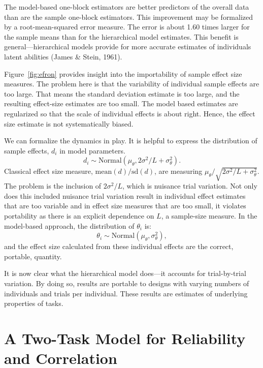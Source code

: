\documentclass[english,man]{apa6}
\theoremstyle{definition}
\theoremstyle{definition}
\theoremstyle{remark}
\begin{document}
The model-based one-block estimators are better predictors of the
overall data than are the sample one-block estimators. This improvement
may be formalized by a root-mean-squared error measure. The error is
about 1.60 times larger for the sample means than for the hierarchical
model estimates. This benefit is general---hierarchical models provide
for more accurate estimates of individuals latent abilities (James \&
Stein, 1961).

Figure~\ref{fig:efron} provides insight into the importability of sample
effect size measures. The problem here is that the variability of
individual sample effects are too large. That means the standard
deviation estimate is too large, and the resulting effect-size estimates
are too small. The model based estimates are regularized so that the
scale of individual effects is about right. Hence, the effect size
estimate is not systematically biased.

We can formalize the dynamics in play. It is helpful to express the
distribution of sample effects, \(d_i\) in model parameters. \[
d_i \sim \mbox{Normal}(\mu_\theta,2\sigma^2/L + \sigma^2_\theta).
\] Classical effect size measure, \(\mbox{mean}(d)/\mbox{sd}(d)\), are
measuring \(\mu_\theta/\sqrt{2\sigma^2/L + \sigma^2_\theta}\). The
problem is the inclusion of \(2\sigma^2/L\), which is nuisance trial
variation. Not only does this included nuisance trial variation result
in individual effect estimates that are too variable and in effect size
measures that are too small, it violates portability as there is an
explicit dependence on \(L\), a sample-size measure. In the model-based
approach, the distribution of \(\theta_i\) is: \[
\theta_i \sim \mbox{Normal}(\mu_\theta,\sigma^2_\theta),
\] and the effect size calculated from these individual effects are the
correct, portable, quantity.

It is now clear what the hierarchical model does---it accounts for
trial-by-trial variation. By doing so, results are portable to designs
with varying numbers of individuals and trials per individual. These
results are estimates of underlying properties of tasks.

\section{A Two-Task Model for Reliability and
Correlation}\label{a-two-task-model-for-reliability-and-correlation}
\end{document}
